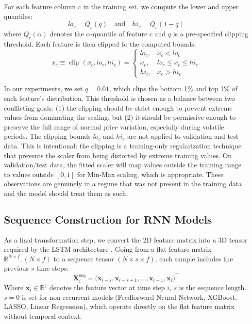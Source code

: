 \documentclass[preprint,12pt,nonatbib]{elsarticle}
\begin{document}
For each feature column \(c\) in the training set, we compute the lower and upper quantiles:
\begin{equation}
    lo_c = Q_c(q)
    \quad \text{and} \quad
    hi_c = Q_c(1 - q)
\end{equation}
where \(Q_c(\alpha)\) denotes the \(\alpha\)-quantile of feature \(c\) and \(q\) is a pre-specified clipping threshold.
Each feature is then clipped to the computed bounds:
\begin{equation}
    x_c \equiv \operatorname{clip}(x_c, lo_c, hi_c) = \begin{cases}
            lo_c, & x_c < lo_c \\
            x_c, & lo_c \leq x_c \leq hi_c \\
            hi_c, & x_c > hi_c
          \end{cases}
\end{equation}

In our experiments, we set \(q = 0.01\), which clips the bottom 1\% and top 1\% of each feature's distribution.
This threshold is chosen as a balance between two conflicting goals: (1) the clipping should be strict enough to prevent extreme values from dominating the scaling, but (2) it should be permissive enough to preserve the full range of normal price variation, especially during volatile periods.
The clipping bounds \(lo_c\) and \(hi_c\) are not applied to validation and test data. This is intentional: the clipping is a training-only regularization technique that prevents the scaler from being distorted by extreme training values. 
On validation/test data, the fitted scaler will map values outside the training range to values outside \([0,1]\) for Min-Max scaling, which is appropriate. 
These observations are genuinely in a regime that was not present in the training data and the model should treat them as such.

\subsection{Sequence Construction for RNN Models}
\label{sub:Sequences}

As a final transformation step, we convert the 2D feature matrix into a 3D tensor required by the LSTM architecture \cite{Hochreiter.1997}.
Going from a flat feature matrix \(\mathbb{R}^{N \times f}, (N \times f)\) to a sequence tensor \((N \times s \times f)\), each sample includes the previous \(s\) time steps:
\begin{equation}
    \mathbf{X}^{\text{seq}}_{i} = \big(\mathbf{x}_{i-s}, \mathbf{x}_{i-s+1}, \dots, \mathbf{x}_{i-1}, \mathbf{x}_{i}\big)^{\top}
    \label{eq:sequences}
\end{equation}
Where \(\mathbf{x}_{i} \in \mathbb{R}^{f}\) denotes the feature vector at time step \(i\), \(s\) is the sequence length. \(s = 0\) is set for non-recurrent models (Feedforward Neural Network, XGBoost, LASSO, Linear Regression), which operate directly on the flat feature matrix without temporal context.
\end{document}
